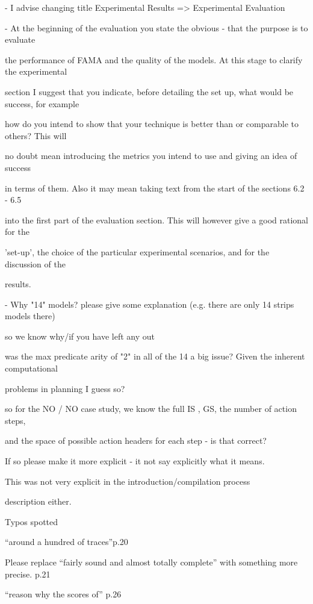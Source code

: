 \documentclass{article}
\begin{document}
\begin{mdframed}[hidealllines=true,backgroundcolor=gray!20]
  - I advise changing title Experimental Results => Experimental Evaluation
\end{mdframed}

\begin{mdframed}[hidealllines=true,backgroundcolor=gray!20]
  - At the beginning of the evaluation you state the obvious - that the purpose is to evaluate 

the performance of FAMA and the quality of the models. At this stage to clarify the experimental 

section I suggest that you indicate, before detailing the set up, what would be success, for example

how do you intend to show that your technique is better than or comparable to others? This will 

no doubt mean introducing the metrics you intend to use and giving an idea of success

in terms of them. Also it may mean taking text from the start of the sections 6.2 - 6.5

 into the first part of the evaluation section. This will however give a good rational for the 

'set-up’, the choice of the particular experimental scenarios, and for the discussion of the

results.
\end{mdframed}

\begin{mdframed}[hidealllines=true,backgroundcolor=gray!20]
  - Why "14" models? please give some explanation (e.g. there are only 14 strips models there)

so we know why/if you have left any out
\end{mdframed}

\begin{mdframed}[hidealllines=true,backgroundcolor=gray!20]
  was the max predicate arity of "2" in all of the 14 a big issue? Given the inherent computational

problems in planning I guess so?
\end{mdframed}

\begin{mdframed}[hidealllines=true,backgroundcolor=gray!20]
  so for the NO / NO case study, we know the full IS , GS, the number of action steps,

and the space of possible action headers for each step - is that correct?

If so please make it more explicit - it not say explicitly what it means.

This was not very explicit in the introduction/compilation process

description either.
\end{mdframed}

\begin{mdframed}[hidealllines=true,backgroundcolor=gray!20]
  Typos spotted


“around a hundred of traces”p.20

Please replace “fairly sound and almost totally complete” with something more precise. p.21

“reason why the scores of” p.26
\end{mdframed}
\end{document}
